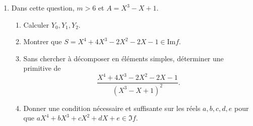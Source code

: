 \begin{enumerate}
\item Dans cette question, $m > 6$ et $A = X^{3} - X + 1$.
\begin{enumerate}
\item Calculer $Y_{0}, Y_{1}, Y_{2}$.
\item Montrer que $S = X^{4}+4X^{3}-2X^{2}-2X-1 \in \mathrm{Im}f$.
\item Sans chercher {\`a} décomposer en éléments simples, déterminer une primitive de
\[
\frac{ X^{4}+4X^{3}-2X^{2}-2X-1}{(X^{3}-X+1)^{2}}.
\]

\item Donner une condition nécessaire et suffisante sur les réels $a,b,c,d,e$ pour que $aX^{4}+bX^{3}+cX^{2}+dX+e \in \Im f$.
\end{enumerate}

\end{enumerate}
